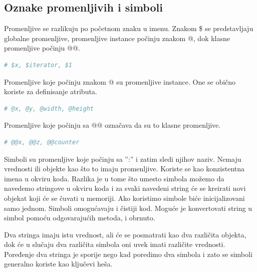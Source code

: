 \documentclass[a4paper]{article}
\begin{document}
\subsection{Oznake promenljivih i simboli}
Promenljive se razlikuju po početnom znaku u imenu. Znakom \$ se predstavljaju globalne promenljive, promenljive instance počinju znakom @, dok klasne promenljive počinju @@.%
\begin{lstlisting}[language=Ruby]
	# $x, $iterator, $1
\end{lstlisting}\vspace*{-15pt}
Promenljive koje počinju znakom @ su promenljive instance. One se obično koriste za definisanje atributa.
\begin{lstlisting}[language=Ruby]
	# @x, @y, @width, @height
\end{lstlisting}\vspace*{-15pt}
Promenljive koje počinju sa @@ označava da su to klasne promenljive.
\begin{lstlisting}[language=Ruby]
	# @@x, @@z, @@counter
\end{lstlisting}\vspace*{-20pt}

Simboli su promenljive koje počinju sa '':'' i zatim sledi njihov naziv. Nemaju vrednosti ili objekte kao što to imaju promenljive. Koriste se kao konzistentna imena u okviru koda. Razlika je u tome što umesto simbola možemo da navedemo stringove u okviru koda i za svaki navedeni string će se kreirati novi objekat koji će se čuvati u memoriji. Ako koristimo simbole biće inicijalizovani samo jednom. Simboli omogućavaju i čistiji kod. Moguće je konvertovati string u simbol pomoću odgovarajućih metoda, i obrnuto.

Dva stringa imaju istu vrednost, ali će se posmatrati kao dva različita objekta, dok će u slučaju dva različita simbola oni uvek imati različite vrednosti. Poređenje dva stringa je sporije nego kad poredimo dva simbola i zato se simboli generalno koriste kao ključevi heša.

\end{document}
